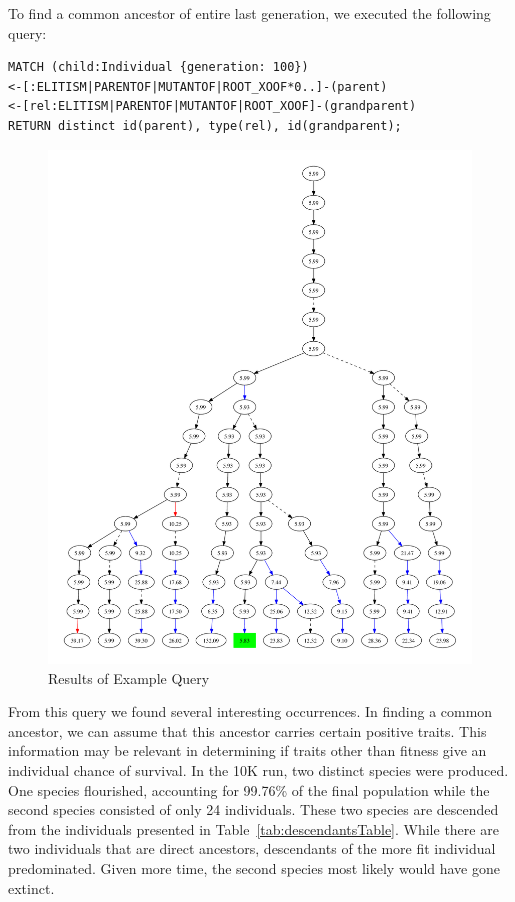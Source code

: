 \documentclass[12pt]{article}
\begin{document}
To find a common ancestor of entire last generation, we executed the following query:   

\begin{verbatim}
MATCH (child:Individual {generation: 100})
<-[:ELITISM|PARENTOF|MUTANTOF|ROOT_XOOF*0..]-(parent)
<-[rel:ELITISM|PARENTOF|MUTANTOF|ROOT_XOOF]-(grandparent)
RETURN distinct id(parent), type(rel), id(grandparent);
\end{verbatim}

\begin{figure}[tb]
 \centering
 \includegraphics[width= \textwidth]{subset_confluence_trimmed}
 \caption{Results of Example Query}
 \label{fig:exampleQuery1}
\end{figure}

From this query we found several interesting occurrences. In finding a common ancestor, we can assume that this ancestor carries certain positive traits. This information may be relevant in determining if traits other than fitness give an individual  chance of survival. In the 10K run, two distinct species were produced. One species flourished, accounting for 99.76\% of the final population while the second species consisted of only 24 individuals. These two species are descended from the individuals presented in Table~\ref{tab:descendantsTable}. While there are two individuals that are direct ancestors, descendants of the more fit individual predominated. Given more time, the second species most likely would have gone extinct.
\end{document}
